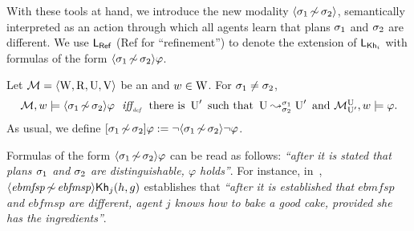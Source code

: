 \medskip

With these tools at hand, we introduce the new modality $\langle \sigma_1{\,\not\sim\,}\sigma_2 \rangle$, semantically interpreted
as an action through which all agents learn that plans $\sigma_1$ and
$\sigma_2$ are  different.
We use $\mathsf{L_{Ref}}$ ({\small\textsf{Ref}} for ``refinement'') to denote the extension of $\mathsf{L}_{{\sf Kh}_i}$ with formulas of the form $\langle \sigma_1{\,\not\sim\,}\sigma_2 \rangle\varphi$.

\medskip

\begin{definition}\label{def:ref-sem}
Let $\mathcal{M}=\langle \operatorname{W},\operatorname{R},\operatorname{U},\operatorname{V} \rangle$ be an \ults and $w \in \operatorname{W}$.
For $\sigma_1\neq\sigma_2$,
\[
\begin{array}{l@{\ \ }c@{\ \ }l}
\modults,w\models \refdiam{\plan_1}{\plan_2}\varphi & \iffdef & \text{there is } \Unc' \text{ such that } \splitstr{\Unc}{\Unc'}{\plan_1}{\plan_2} \text{ and }  \modults^{\Unc}_{\Unc'},w \models \varphi.
\end{array}
\]
As usual, we define $[{\sigma_1{\,\not\sim\,}\sigma_2}]\varphi := \lnot \langle \sigma_1{\,\not\sim\,}\sigma_2 \rangle\lnot\varphi$.
\end{definition}

\medskip

Formulas of the form $\langle \sigma_1{\,\not\sim\,}\sigma_2 \rangle\varphi$ can be read as follows: \emph{``after it is stated that plans $\sigma_1$ and $\sigma_2$ are distinguishable, $\varphi$ holds''}. For instance, in~, $\langle \mathit{ebmfsp}{\,\not\sim\,}\mathit{ebfmsp} \rangle{\sf Kh}_j(h,g)$ establishes that \emph{``after it is established that $\mathit{ebmfsp}$ and $\mathit{ebfmsp}$ are different, agent $j$ knows how to bake a good cake, provided she has the ingredients''}. 

